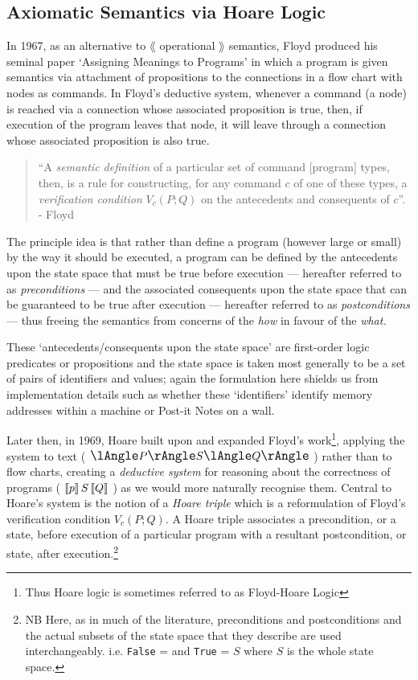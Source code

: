 \documentclass[oneside,12pt]{article}
\newcommand\NB[1][0.1]{NB \; \; } %
\newcommand{\impcode}[1]{\texttt{#1}}
\newcommand{\textM}[1]{$#1$}
\newcommand{\pctrip}[3]{$\large{\lAngle}\normalsize{#1}\large{\rAngle}%
  \normalsize{#2}\large{\lAngle}\normalsize{#3}\large{\rAngle}\normalsize$}
\newcommand{\tctrip}[3]{$\large{\llbracket}\normalsize{#1}\large{\rrbracket}\,%
  \normalsize{#2}\,\large{\llbracket}\normalsize{#3}\large{\rrbracket}\normalsize$}
\begin{document}
\subsection{Axiomatic Semantics via Hoare Logic}


In 1967, as an alternative to $\lAngle$ operational $\rAngle$ semantics, Floyd\cite{Floyd1967Flowcharts} produced his seminal paper `Assigning Meanings to Programs' in which a program is given semantics via attachment of propositions to the connections in a flow chart with nodes as commands. In Floyd's deductive system, whenever a command (a node) is reached via a connection whose associated proposition is true, then, if execution of the program leaves that node, it will leave through a connection whose associated proposition is also true.

\begin{quote}

``A \emph{semantic definition} of a particular set of command [program] types, then, is a rule for constructing, for any command \textM{c} of one of these types, a \emph{verification condition} \textM{V_c(P;Q)} on the antecedents and consequents of \textM{c}''. - \footnotesize Floyd\cite{Floyd1967Flowcharts}

\end{quote}

The principle idea is that rather than define a program (however large or small) by the way it should be executed, a program can be defined by the antecedents upon the state space that must be true before execution --- hereafter referred to as \emph{preconditions} --- and the associated consequents upon the state space that can be guaranteed to be true after execution --- hereafter referred to as \emph{postconditions} --- thus freeing the semantics from concerns of the \emph{how} in favour of the \emph{what.}


These `antecedents/consequents upon the state space' are first-order logic predicates or propositions and the state space is taken most generally to be a set of pairs of identifiers and values; again the formulation here shields us from implementation details such as whether these `identifiers' identify memory addresses within a machine or Post-it Notes on a wall.

Later then, in 1969, Hoare\cite{hoare1969axiomatic} built upon and expanded Floyd's work\footnote{Thus Hoare logic is sometimes referred to as Floyd-Hoare Logic}, applying the system to text (\; \pctrip{P}{S}{Q} \;) rather than to flow charts, creating a \emph{deductive system} for reasoning about the correctness of programs ( \tctrip{p}{S}{Q} ) as we would more naturally recognise them. Central to Hoare's system is the notion of a \emph{Hoare triple} which is a reformulation of Floyd's verification condition \textM{V_c(P;Q)}. A Hoare triple associates a precondition, or a state, before execution of a particular program with a resultant postcondition, or state, after execution.\footnote{\NB Here, as in much of the literature, preconditions and postconditions and the actual subsets of the state space that they describe are used interchangeably. i.e. \impcode{False} = \emptyset and \impcode{True} = \textM{S} where \textM{S} is the whole state space.} 
\end{document}
